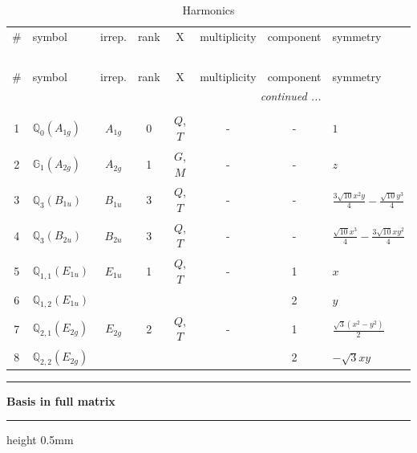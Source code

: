 \documentclass[fleqn,10pt,landscape]{jsarticle}
\begin{document}
\renewcommand{\arraystretch}{1.6}
\begin{longtable}[l]{clcccccl}
\captionsetup{justification=raggedright, singlelinecheck=off}
\caption{Harmonics}
 \\
 \hline \hline
\# & symbol & irrep. & rank & X & multiplicity & component & symmetry \\ \hline \endfirsthead

\multicolumn{7}{l}{\tablename\ \thetable{}} \\
 \hline \hline
\# & symbol & irrep. & rank & X & multiplicity & component & symmetry \\ \hline \endhead

 \hline \hline
\multicolumn{7}{r}{\footnotesize\it continued ...} \\ \endfoot

 \hline \hline
\multicolumn{7}{r}{} \\ \endlastfoot

1 & $\mathbb{Q}_{0}(A_{1g})$ & $A_{1g}$ & 0 & $Q$, $T$ & - & - & $1$ \\ \hline
2 & $\mathbb{G}_{1}(A_{2g})$ & $A_{2g}$ & 1 & $G$, $M$ & - & - & $z$ \\ \hline
3 & $\mathbb{Q}_{3}(B_{1u})$ & $B_{1u}$ & 3 & $Q$, $T$ & - & - & $\frac{3 \sqrt{10} x^{2} y}{4} - \frac{\sqrt{10} y^{3}}{4}$ \\ \hline
4 & $\mathbb{Q}_{3}(B_{2u})$ & $B_{2u}$ & 3 & $Q$, $T$ & - & - & $\frac{\sqrt{10} x^{3}}{4} - \frac{3 \sqrt{10} x y^{2}}{4}$ \\ \hline
5 & $\mathbb{Q}_{1,1}(E_{1u})$ & $E_{1u}$ & 1 & $Q$, $T$ & - & 1 & $x$ \\
6 & $\mathbb{Q}_{1,2}(E_{1u})$ &  &  &  &  & 2 & $y$ \\ \hline
7 & $\mathbb{Q}_{2,1}(E_{2g})$ & $E_{2g}$ & 2 & $Q$, $T$ & - & 1 & $\frac{\sqrt{3} \left(x^{2} - y^{2}\right)}{2}$ \\
8 & $\mathbb{Q}_{2,2}(E_{2g})$ &  &  &  &  & 2 & $- \sqrt{3} x y$ \\
\end{longtable}
\vspace{5mm}
\noindent \rule[0.5mm]{5mm}{0.5mm}\hspace{3mm}\textbf{Basis in full matrix}\hspace{3mm}\leaders\hrule height 0.5mm\hfill\kern0pt
\vspace{3mm}
\end{document}
